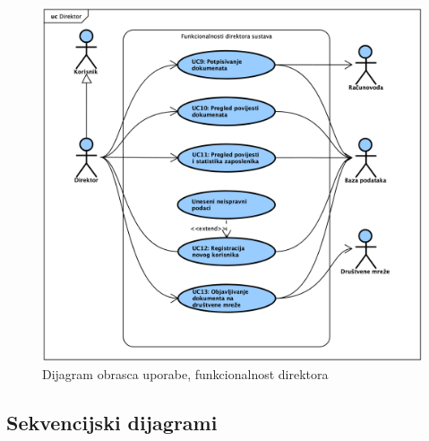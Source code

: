 					\begin{figure}[H]
						\includegraphics[width=\textwidth]{slike/UseCase_Direktor.png}
						\caption{Dijagram obrasca uporabe, funkcionalnost direktora}
						\label{fig:usecase_direktor}
					\end{figure}
				\eject{}
				
			\subsection{Sekvencijski dijagrami}

